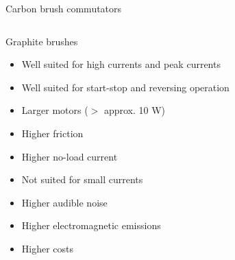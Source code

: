 \documentclass[compress]{beamer}
\begin{document}

\begin{frame}{Carbon brush commutators}
    \begin{columns}
        \begin{column}{0.6\linewidth}

            Graphite brushes

            \begin{itemize}
                \item Well suited for high currents and peak currents
                \item Well suited for start-stop and reversing operation
                \item Larger motors ($>$ approx. 10 W)
                \item Higher friction
                \item Higher no-load current
                \item Not suited for small currents
                \item Higher audible noise
                \item Higher electromagnetic emissions
                \item Higher costs
            \end{itemize}

        \end{column}
        \begin{column}{0.4\linewidth}

            \begin{center}


\end{center}
\end{column}
\end{columns}
\end{frame}
\end{document}
